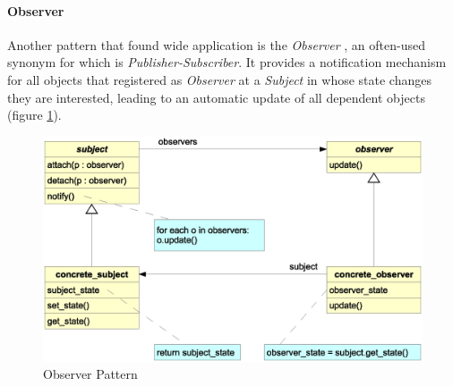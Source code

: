 %
%
%
%
%
%
%

\paragraph{Observer}
\label{observer_heading}

Another pattern that found wide application is the \emph{Observer} \cite{gamma1995},
an often-used synonym for which is \emph{Publisher-Subscriber}. It provides a
notification mechanism for all objects that registered as \emph{Observer} at a
\emph{Subject} in whose state changes they are interested, leading to an automatic
update of all dependent objects (figure \ref{observer_figure}).

\begin{figure}[ht]
    \begin{center}
        \includegraphics[scale=0.3]{vector/observer.eps}
        \caption{Observer Pattern}
        \label{observer_figure}
    \end{center}
\end{figure}


